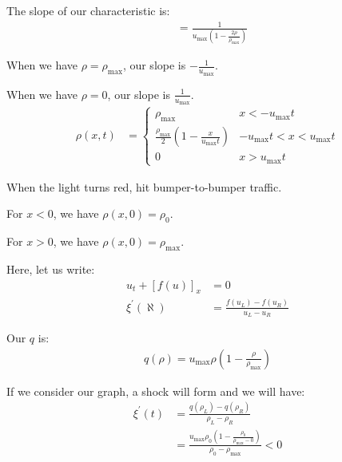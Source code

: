 \documentclass{article}
\begin{document}
The slope of our characteristic is:
%
\begin{align}
  & = \frac{1}{u_{\max} \left(1 - \frac{2 \rho}{\rho_{\max}}\right)}
\end{align}

When we have $\rho = \rho_{\max}$, our slope is $- \frac{1}{u_{\max}}$.

When we have $\rho = 0$, our slope is $\frac{1}{u_{\max}}$.
%
\begin{align}
  \rho(x, t) & =
  \begin{cases}
    \rho_{\max} & x < - u_{\max} t\\
    \frac{\rho_{\max}}{2} \left(1 - \frac{x}{u_{\max}t}\right)
    & -u_{\max} t < x < u_{\max} t\\
    0 & x > u_{\max} t
  \end{cases}
\end{align}

\ex When the light turns red, hit bumper-to-bumper traffic.

For $x < 0$, we have $\rho(x, 0) = \rho_0$.

For $x > 0$, we have $\rho(x, 0) = \rho_{\max}$.

Here, let us write:
%
\begin{align}
  u_t + [f(u)]_x & = 0\\
  \xi^\prime(\aleph) & = \frac{f(u_L) - f(u_R)}{u_L - u_R}
\end{align}

Our $q$ is:
%
\begin{align}
  q(\rho) = u_{\max} \rho\left(1 - \frac{\rho}{\rho_{\max}}\right)
\end{align}

If we consider our graph, a shock will form and we will have:
%
\begin{align}
  \xi^\prime(t) & = \frac{q(\rho_L) - q(\rho_R)}{\rho_L - \rho_R}\\
  & = \frac{u_{\max} \rho_0 \left( 1 - \frac{\rho_0}{\rho_{\max} - 0}\right)}{\rho_0 - \rho_{\max}} < 0
\end{align}
\end{document}

